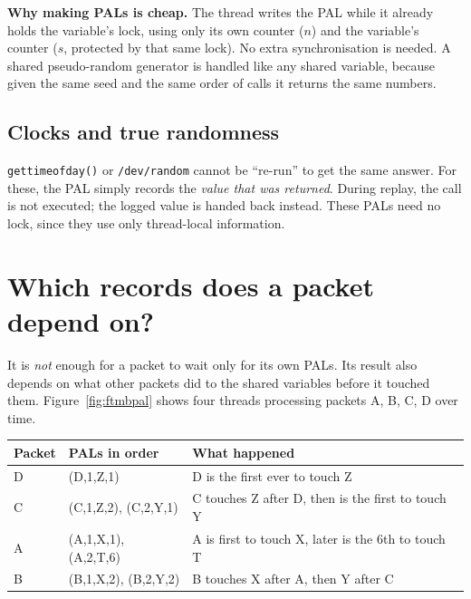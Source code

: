 \textbf{Why making PALs is cheap.} The thread writes the PAL while it already holds the variable's lock, using only its own counter
($n$) and the variable's counter ($s$, protected by that same lock). No extra synchronisation is needed. A shared pseudo-random
generator is handled like any shared variable, because given the same seed and the same order of calls it returns the same numbers.

\subsection{Clocks and true randomness}
\texttt{gettimeofday()} or \texttt{/dev/random} cannot be ``re-run'' to get the same answer. For these, the PAL simply records the
\emph{value that was returned}. During replay, the call is not executed; the logged value is handed back instead. These PALs need no
lock, since they use only thread-local information.

\section{Which records does a packet depend on?}\label{sec:ftmbdeps}

It is \emph{not} enough for a packet to wait only for its own PALs. Its result also depends on what other packets did to the
shared variables before it touched them. Figure~\ref{fig:ftmbpal} shows four threads processing packets A, B, C, D over time.


\begin{center}
\begin{tabular}{@{}lll@{}}
\toprule
Packet & PALs in order & What happened\\
\midrule
D & (D,1,Z,1) & D is the first ever to touch Z\\
C & (C,1,Z,2), (C,2,Y,1) & C touches Z after D, then is the first to touch Y\\
A & (A,1,X,1), (A,2,T,6) & A is first to touch X, later is the 6th to touch T\\
B & (B,1,X,2), (B,2,Y,2) & B touches X after A, then Y after C\\
\bottomrule
\end{tabular}
\end{center}

